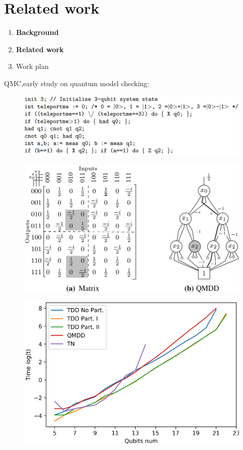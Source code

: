 \documentclass[aspectratio=1610,18pt]{ctexbeamer}
\begin{document}
\section{Related work}
\begin{frame}
  \begin{enumerate}
    \Large
    \item \textbf{Background}
    \item \textbf{Related work}
    \item Work plan
  \end{enumerate}
\end{frame}
\begin{frame}
  QMC,early study on quantum model checking:
  \begin{figure}
    \includegraphics[width=.9\textwidth]{first.png}
  \end{figure}
\end{frame}
\begin{frame}
  \begin{figure}
    \includegraphics[width=.8\textwidth]{QMDD.png}
  \end{figure}
\end{frame}
\begin{frame}
  \begin{figure}
    \includegraphics[width=.6\textwidth]{result.png}
  \end{figure}
\end{frame}
\end{document}
